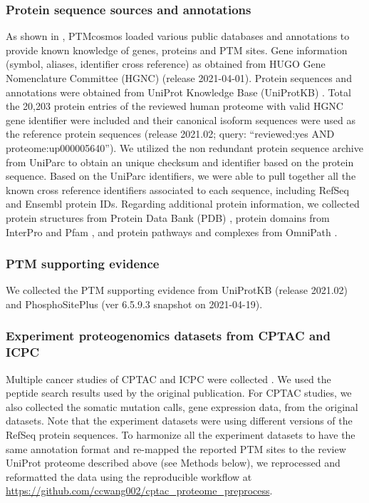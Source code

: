 \subsubsection{Protein sequence sources and annotations}
As shown in , PTMcosmos loaded various public databases and annotations to provide known knowledge of genes, proteins and PTM sites. Gene information (symbol, aliases, identifier cross reference) as obtained from HUGO Gene Nomenclature Committee (HGNC) \cite{brufordea_tweedies:GuidelinesHuman2020} (release 2021-04-01). Protein sequences and annotations were obtained from UniProt Knowledge Base (UniProtKB) \cite{theuniprotconsortium_theuniprotconsortium:UniProtWorldwide2019}. Total the 20,203 protein entries of the reviewed human proteome with valid HGNC gene identifier were included and their canonical isoform sequences were used as the reference protein sequences (release 2021.02; query: ``reviewed:yes AND proteome:up000005640''). We utilized the non redundant protein sequence archive from UniParc \cite{leinonenr_apweilerr:UniProtArchive2004} to obtain an unique checksum and identifier based on the protein sequence. Based on the UniParc identifiers, we were able to pull together all the known cross reference identifiers associated to each sequence, including RefSeq and Ensembl protein IDs. Regarding additional protein information, we collected protein structures from Protein Data Bank (PDB) \cite{bermanhm_bournepe:ProteinData2000}, protein domains from InterPro \cite{blumm_finnrd:InterProProtein2021} and Pfam \cite{mistryj_batemana:PfamProtein2021}, and protein pathways and complexes from OmniPath \cite{tureid_saez-rodriguezj:OmniPathGuidelines2016}.

\subsubsection{PTM supporting evidence}
We collected the PTM supporting evidence from UniProtKB (release 2021.02) and PhosphoSitePlus \cite{hornbeckpv_skrzypeke:PhosphoSitePlus2015} (ver 6.5.9.3 snapshot on 2021-04-19).

\subsubsection{Experiment proteogenomics datasets from CPTAC and ICPC}
Multiple cancer studies of CPTAC and ICPC were collected . We used the peptide search results used by the original publication. For CPTAC studies, we also collected the somatic mutation calls, gene expression data, from the original datasets. Note that the experiment datasets were using different versions of the RefSeq protein sequences. To harmonize all the experiment datasets to have the same annotation format and re-mapped the reported PTM sites to the review UniProt proteome described above (see Methods below), we reprocessed and reformatted the data using the reproducible workflow at \url{https://github.com/ccwang002/cptac_proteome_preprocess}.

